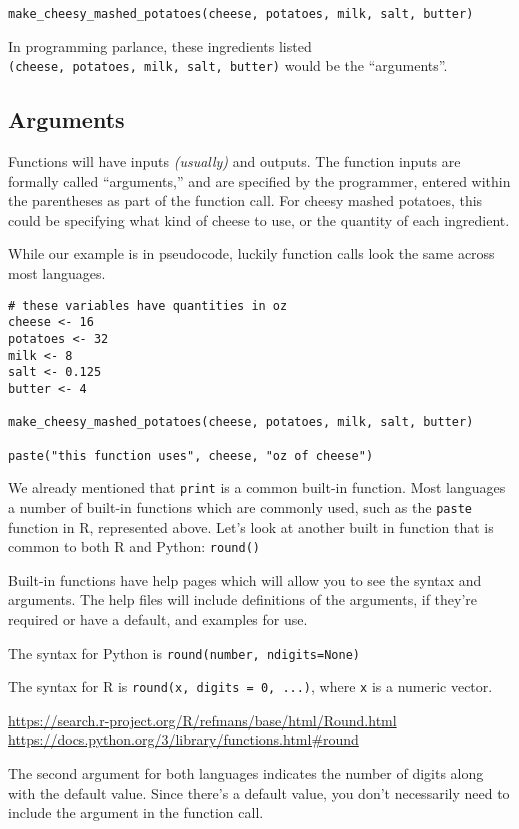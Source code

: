 \documentclass[
]{book}
\begin{document}
\begin{verbatim}
make_cheesy_mashed_potatoes(cheese, potatoes, milk, salt, butter)
\end{verbatim}

In programming parlance, these ingredients listed \texttt{(cheese,\ potatoes,\ milk,\ salt,\ butter)} would be the ``arguments''.

\subsection{Arguments}\label{arguments}

Functions will have inputs \emph{(usually)} and outputs. The function inputs are formally called ``arguments,'' and are specified by the programmer, entered within the parentheses as part of the function call. For cheesy mashed potatoes, this could be specifying what kind of cheese to use, or the quantity of each ingredient.

While our example is in pseudocode, luckily function calls look the same across most languages.

\begin{verbatim}
# these variables have quantities in oz
cheese <- 16
potatoes <- 32
milk <- 8
salt <- 0.125
butter <- 4

make_cheesy_mashed_potatoes(cheese, potatoes, milk, salt, butter)

paste("this function uses", cheese, "oz of cheese")
\end{verbatim}

We already mentioned that \texttt{print} is a common built-in function. Most languages a number of built-in functions which are commonly used, such as the \texttt{paste} function in R, represented above. Let's look at another built in function that is common to both R and Python: \texttt{round()}

Built-in functions have help pages which will allow you to see the syntax and arguments. The help files will include definitions of the arguments, if they're required or have a default, and examples for use.

The syntax for Python is \texttt{round(number,\ ndigits=None)}

The syntax for R is \texttt{round(x,\ digits\ =\ 0,\ ...)}, where \texttt{x} is a numeric vector.

\url{https://search.r-project.org/R/refmans/base/html/Round.html}
\url{https://docs.python.org/3/library/functions.html\#round}

The second argument for both languages indicates the number of digits along with the default value. Since there's a default value, you don't necessarily need to include the argument in the function call.
\end{document}
